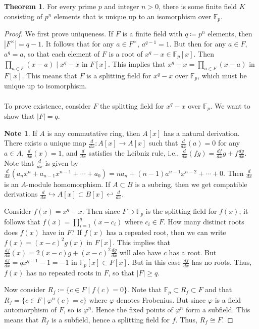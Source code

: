 \documentclass[10pt,letterpaper,cm]{nupset}
\theoremstyle{definition}
\newtheorem{note}{Note}
\newtheorem{theorem}{Theorem}
\newcommand{\F}{\mathbb F}
\newcommand{\1}{\mathbf{1}}
\newcommand{\0}{\vec 0}
\begin{document}
\begin{theorem}
For every prime $p$ and integer $n>0$, there is some finite field $K$ consisting of $p^n$ elements that is unique up to an isomorphism over $\F_p$.
\end{theorem}
\begin{proof}
We first prove uniqueness. If $F$ is a finite field with $q\coloneqq p^n$ elements, then $|F^{\times}| = q-1$. It follows that for any $a \in F^{\times}$,  $a^{q-1} =1$. But then for any $a \in F$, $a^q = a$, so that each element of $F$ is a root of $x^q -x \in \F_p[x]$. Then $\prod_{a\in F}(x-a) \mid x^q -x$ in $F[x]$. This implies that $x^q -x = \prod_{a\in F}(x-a)$ in $F[x]$. This means that $F$ is a splitting field for $x^q-x$ over $\F_p$, which must be unique up to isomorphism.
\\ \\ To prove existence, consider $F$ the splitting field for $x^q -x$ over $\F_p$. We want to show that $|F| =q$. 
\begin{note}
If $A$ is any commutative ring, then $A[x]$ has a natural derivation. There exists a unique map $\frac{d}{dx} : A[x] \to A[x]$ such that $\frac{d}{dx}(a) = 0$ for any $a\in A$, $\frac{d}{dx}(x) =1$, and $\frac{d}{dx}$ satisfies the Leibniz rule, i.e., $\frac{d}{dx}(fg) = \frac{df}{dx}g + f\frac{dg}{dx}$. Note that $\frac{d}{dx}$ is given by $\frac{d}{dx}(a_nx^n  + a_{n-1}x^{n-1} + \cdots + a_0) = na_n + (n-1)a^{n-1}x^{n-2} + \cdots + 0$. Then $\frac{d}{dx}$ is an $A$-module homomorphism. If $A \subset B$ is a subring, then we get compatible derivations $\frac{d}{dx} \hookrightarrow A[x] \subset B[x] \hookleftarrow \frac{d}{dx}$. 
\end{note}

Consider $f(x) = x^q -x$. Then since $F \supset \F_p$ is the splitting field for $f(x)$, it follows that $f(x) = \prod_{i=1}^q (x-c_i)$ where $c_i \in F$. How many distinct roots does $f(x)$ have in $F$? If $f(x)$ has a repeated root, then we can write $f(x) = (x-c)^2g(x)$ in $F[x]$. This implies that $\frac{df}{dx}(x) = 2(x-c)g + (x-c)^2 \frac{dg}{dx}$ will also have $c$ has a root. But $\frac{df}{dx} = qx^{q-1} -1 = {-}1$ in $\F_p[x]\subset F[x]$. But in this case $\frac{df}{dx}$ has no roots. Thus, $f(x)$ has no repeated roots in $F$, so that $|F| \geq q$.

Now consider $R_f\coloneqq  \{c \in F \mid f(c) = 0\}$. Note that $\F_p \subset R_f \subset F$ and that  $R_f = \{c\in F \mid \varphi^n(c) = c\}$ where $\varphi$ denotes Frobenius. But since $\varphi$ is a field automorphism of $F$, so is $\varphi^n$. Hence the fixed points of $\varphi^n$ form a subfield. This means that $R_f$ is a subfield, hence a splitting field for $f$. Thus, $R_f \cong F$. 
\end{proof}
\end{document}
